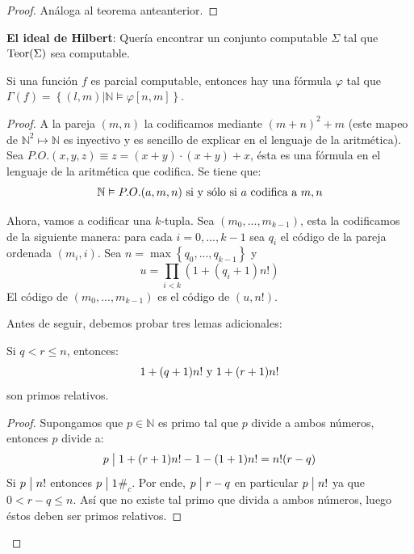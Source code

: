 \documentclass[12pt]{report}
\newcounter{it}
\theoremstyle{largebreak}
\newcommand\divides{\ensuremath{\bigm|}}
\newcommand\contradiction{\ensuremath{\#_c}}
\begin{document}
    \begin{proof}
        Análoga al teorema anteanterior.
    \end{proof}

    \textbf{El ideal de Hilbert}: Quería encontrar un conjunto computable $\Sigma$ tal que $\textup{Teor}(\Sigma)$ sea computable.


    \begin{theor}
        Si una función $f$ es parcial computable, entonces hay una fórmula $\varphi$ tal que $\Gamma(f)=\left\{(l,m)\Big|\mathbb{N}\vDash\varphi[n,m] \right\}$.
    \end{theor}
    
    \begin{proof}
        A la pareja $(m,n)$ la codificamos mediante $(m+n)^2+m$ (este mapeo de $\mathbb{N}^2\mapsto\mathbb{N}$ es inyectivo y es sencillo de explicar en el lenguaje de la aritmética). Sea $P.O.(x,y,z)\equiv z=(x+y)\cdot(x+y)+x$, ésta es una fórmula en el lenguaje de la aritmética que codifica. Se tiene que:
        \begin{equation*}
            \mathbb{N}\vDash P.O.(a,m,n)\textup{ si y sólo si }a\textup{ codifica a }m,n
        \end{equation*}

        Ahora, vamos a codificar una $k$-tupla. Sea $(m_0,...,m_{ k-1})$, esta la codificamos de la siguiente manera: para cada $i=0,...,k-1$ sea $q_i$ el código de la pareja ordenada $(m_i,i)$. Sea $n=\max\left\{q_0,...,q_{ k-1}\right\}$ y
        \begin{equation}
            \label{equationofu}
            u=\prod_{ i<k}(1+(q_i+1)n!)
        \end{equation}
        El código de $(m_0,...,m_{ k-1})$ es el código de $(u,n!)$.

        Antes de seguir, debemos probar tres lemas adicionales:

        \begin{lema}
            Si $q<r\leq n$, entonces:
            \begin{equation*}
                1+(q+1)n!\textup{ y }1+(r+1)n!
            \end{equation*}
            son primos relativos.
        \end{lema}

        \begin{proof}
            Supongamos que $p\in\mathbb{N}$ es primo tal que $p$ divide a ambos números, entonces $p$ divide a:
            \begin{equation*}
                p\divides 1+(r+1)n!-1-(1+1)n!=n!(r-q)
            \end{equation*}
            Si $p\divides n!$ entonces $p\divides 1$\contradiction. Por ende, $p\divides r-q$ en particular $p\divides n!$ ya que $0<r-q\leq n$. Así que no existe tal primo que divida a ambos números, luego éstos deben ser primos relativos.
        \end{proof}


\end{proof}
\end{document}
